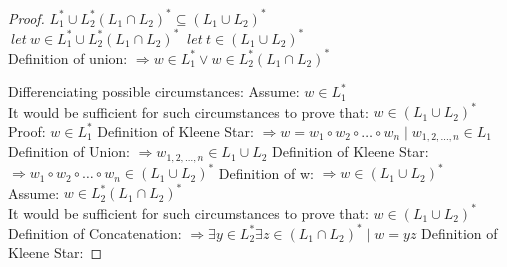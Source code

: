 \documentclass{article}
\begin{document}
\begin{proof}
  $L_1^{*} \cup L_2^{*}(L_1 \cap L_2)^{*} \subseteq (L_1 \cup L_2)^{*}$ \newline
\\
  $~let~ w \in L_1^{*} \cup L_2^{*}(L_1 \cap L_2)^{*}$ \newline
  $~let~ t \in (L_1 \cup L_2)^{*}$ \newline
\\
  Definition of union: \newline
  $\Longrightarrow w \in L_1^{*} \vee w \in L_2^{*}(L_1 \cap L_2)^{*}$


  Differenciating possible circumstances: \newline
  Assume: $w \in L_1^{*}$ \newline
\\
It would be sufficient for such circumstances to prove that: \newline
  $w \in (L_1 \cup L_2)^{*}$ \newline
\\
Proof: \newline
  $w \in L_1^{*}$ \newline
  Definition of Kleene Star: \newline
  $\Longrightarrow w = w_1 \circ w_2 \circ \ldots \circ w_n \mid w_{1,2, \ldots, n} \in L_1$ \newline
  Definition of Union: \newline
  $\Longrightarrow w_{1,2, \ldots, n} \in L_1 \cup L_2$ \newline
  Definition of Kleene Star: \newline
  $\Longrightarrow w_1 \circ w_2 \circ \ldots \circ w_n \in (L_1 \cup L_2)^{*} $ \newline
  Definition of w: \newline
  $\Longrightarrow w \in (L_1 \cup L_2)^{*} $ \newline
\\
  Assume: $w \in L_2^{*}(L_1 \cap L_2)^{*}$ \newline
  \\
  It would be sufficient for such circumstances to prove that: \newline
  $w \in (L_1 \cup L_2)^{*}$ \newline
  Definition of Concatenation: \newline
  $\Longrightarrow \exists y \in L_2^{*} \exists z \in (L_1 \cap L_2)^{*} \mid w = yz$ \newline
  Definition of Kleene Star: \newline

\end{proof}
\end{document}
